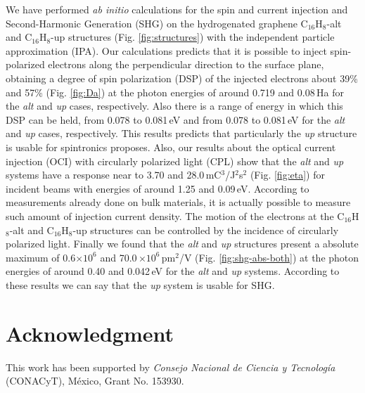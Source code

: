 \documentclass[pss]{wiley2sp} %
\begin{document}
We have performed \emph{ab initio} calculations for the spin and current injection and
Second-Harmonic Generation (SHG) on the hydrogenated graphene C$_{16}$H$_{8}$-alt and
C$_{16}$H$_{8}$-up structures (Fig. \ref{fig:structures}) with the
independent particle approximation (IPA). Our calculations predicts that it is
possible to inject spin-polarized electrons along the perpendicular direction
to the surface plane, obtaining a degree of spin polarization (DSP) of the
injected electrons about 39\% and 57\%  (Fig. \ref{fig:Da}) at the photon energies of around 0.719
and 0.08\,Ha  for the \emph{alt} and \emph{up} cases, respectively. Also there is a range of energy
in which this DSP can be held, from 0.078 to 0.081\,eV and from 0.078 to 0.081\,eV for the \emph{alt} and \emph{up} cases, respectively. This results predicts that particularly the \emph{up} structure is usable for spintronics proposes. 
Also, our results about the optical current injection (OCI) with circularly polarized light (CPL)
show that the \emph{alt}  and \emph{up} systems have a response near to 3.70
and 28.0\,mC$^{3}$/J$^{2}$s$^{2}$ (Fig. \ref{fig:eta}) for incident beams with energies of around
1.25 and 0.09\,eV. According to measurements already done on bulk materials, it
is actually possible to measure such amount of injection current density. The motion of the electrons at the
C$_{16}$H$_{8}$-alt and C$_{16}$H$_{8}$-up structures can be controlled by the incidence of circularly
polarized light. Finally we found that the \emph{alt} and \emph{up} structures
present a absolute maximum of 0.6$\times 10^{6}$ and 70.0\,$\times 10^{6}
$\,pm$^{2}$/V (Fig. \ref{fig:shg-abs-both}) at the photon energies of around 0.40 and 0.042\,eV for the \emph{alt} and \emph{up} systems.
According to these results we can say that the \emph{up} system is usable for SHG.


\section{Acknowledgment} %
\label{sec:Acknouledgment}

This work has been supported by \emph{Consejo Nacional de Ciencia y
Tecnolog\'ia} (CONACyT), M\'exico, Grant No. 153930.




\end{document}
